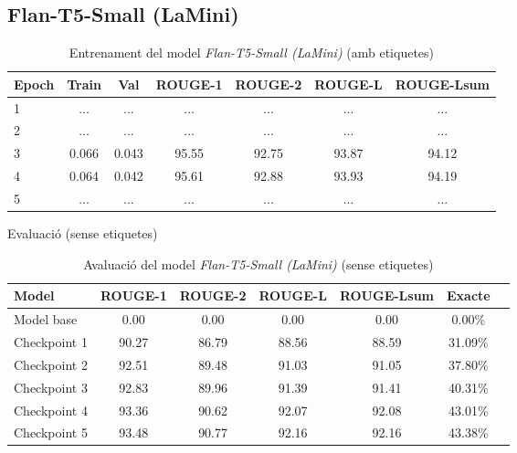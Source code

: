 \subsection{Flan-T5-Small (LaMini)}
\begin{table}[H]
    \centering
    \begin{tabular}{lcccccc}
    \toprule
    Epoch & Train & Val & ROUGE-1 & ROUGE-2 & ROUGE-L & ROUGE-Lsum \\
    \midrule
    1 & ... & ... & ... & ... & ... & ... \\
    2 & ... & ... & ... & ... & ... & ... \\
    3 & 0.066 & 0.043 & 95.55 & 92.75 & 93.87 & 94.12 \\
    4 & 0.064 & 0.042 & 95.61 & 92.88 & 93.93 & 94.19 \\
    5 & ... & ... & ... & ... & ... & ... \\
    \bottomrule
    \end{tabular}
    \caption[Entrenament del model \textit{Flan-T5-Small (LaMini)}]{Entrenament del model \textit{Flan-T5-Small (LaMini)} (amb etiquetes)}
\end{table}

\begin{table}[H]
    \centering
    \caption{Evaluació (sense etiquetes)}
    \begin{tabular}{lcccccc}
    \toprule
    Model & ROUGE-1 & ROUGE-2 & ROUGE-L & ROUGE-Lsum & Exacte \\
    \midrule
    Model base   & 0.00  & 0.00  & 0.00  & 0.00  & 0.00\% \\
    Checkpoint 1 & 90.27 & 86.79 & 88.56 & 88.59 & 31.09\% \\
    Checkpoint 2 & 92.51 & 89.48 & 91.03 & 91.05 & 37.80\% \\
    Checkpoint 3 & 92.83 & 89.96 & 91.39 & 91.41 & 40.31\% \\
    Checkpoint 4 & 93.36 & 90.62 & 92.07 & 92.08 & 43.01\% \\
    Checkpoint 5 & 93.48 & 90.77 & 92.16 & 92.16 & 43.38\% \\
    \bottomrule
    \end{tabular}
    \caption[Avaluació del model \textit{Flan-T5-Small (LaMini)}]{Avaluació del model \textit{Flan-T5-Small (LaMini)} (sense etiquetes)}
\end{table}





